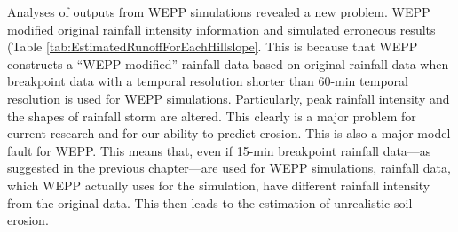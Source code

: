 Analyses of outputs from WEPP simulations revealed a new problem. WEPP modified
original rainfall intensity information and simulated erroneous results
(Table \ref{tab:EstimatedRunoffForEachHillslope}.  This is because that WEPP
constructs a ``WEPP-modified'' rainfall data based on original rainfall data
when breakpoint data with a temporal resolution shorter than 60-min temporal
resolution is
used for WEPP simulations. Particularly, peak rainfall intensity and the shapes
of rainfall storm are altered. This clearly is a major problem for current
research and for our ability to predict erosion. This is also a major model
fault for WEPP. This means that, even if 15-min breakpoint rainfall data---as
suggested in the previous chapter---are used for WEPP simulations, rainfall
data, which WEPP actually uses for the simulation, have different rainfall
intensity from the original data. This then leads to the estimation of
unrealistic soil erosion.




